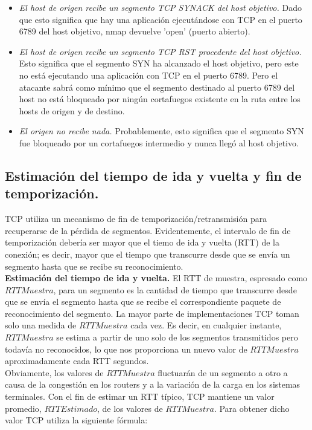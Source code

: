 \documentclass[a4paper,11pt]{article}
\begin{document}
\begin{itemize}
\item \textit{El host de origen recibe un segmento TCP SYNACK del host objetivo.} Dado que esto significa que hay una aplicación ejecutándose con TCP en el puerto 6789 del host objetivo, nmap devuelve 'open' (puerto abierto).

\item \textit{El host de origen recibe un segmento TCP RST procedente del host objetivo.} Esto significa que el segmento SYN ha alcanzado el host objetivo, pero este no está ejecutando una aplicación con TCP en el puerto 6789. Pero el atacante sabrá como mínimo que el segmento destinado al puerto 6789 del host no está bloqueado por ningún cortafuegos existente en la ruta entre los hosts de origen y de destino.

\item \textit{El origen no recibe nada.} Probablemente, esto significa que el segmento SYN fue bloqueado por un cortafuegos intermedio y nunca llegó al host objetivo.
\end{itemize}

\subsection{Estimación del tiempo de ida y vuelta y fin de temporización.}
TCP utiliza un mecanismo de fin de temporización/retransmisión para recuperarse de la pérdida de segmentos. Evidentemente, el intervalo de fin de temporización debería ser mayor que el tiemo de ida y vuelta (RTT) de la conexión; es decir, mayor que el tiempo que transcurre desde que se envía un segmento hasta que se recibe su reconocimiento. \\

\textbf{Estimación del tiempo de ida y vuelta.} El RTT de muestra, espresado como $RTTMuestra$, para un segmento es la cantidad de tiempo que transcurre desde que se envía el segmento hasta que se recibe el correspondiente paquete de reconocimiento del segmento. La mayor parte de implementaciones TCP toman solo una medida de $RTTMuestra$ cada vez. Es decir, en cualquier instante, $RTTMuestra$ se estima a partir de uno solo de los segmentos transmitidos pero todavía no reconocidos, lo que nos proporciona un nuevo valor de $RTTMuestra$ aproximadamente cada RTT segundos. \\

Obviamente, los valores de $RTTMuestra$ fluctuarán de un segmento a otro a causa de la congestión en los routers y a la variación de la carga en los sistemas terminales. Con el fin de estimar un RTT típico, TCP mantiene un valor promedio, $RTTEstimado$, de los valores de $RTTMuestra$. Para obtener dicho valor TCP utiliza la siguiente fórmula:
\end{document}
